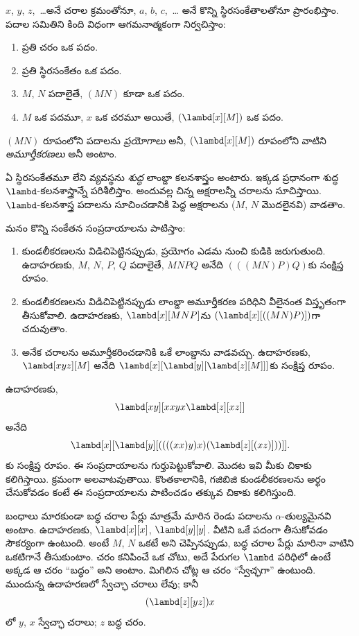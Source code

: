 \documentclass[../../../include/open-logic-section]{subfiles}
\begin{document}

$x$, $y$, $z$,~\dots అనే చరాల క్రమంతోనూ, $a$, $b$, $c$,~\dots
అనే కొన్ని స్థిరసంకేతాలతోనూ ప్రారంభిస్తాం. పదాల సమితిని కింది విధంగా
ఆగమనాత్మకంగా నిర్వచిస్తాం:
\begin{enumerate}
\item ప్రతి చరం ఒక పదం.
\item ప్రతి స్థిరసంకేతం ఒక పదం.
\item $M$, $N$ పదాలైతే, $(MN)$ కూడా ఒక పదం.
\item $M$ ఒక పదమూ, $x$ ఒక చరమూ అయితే, $(\lambd[x][M])$ ఒక పదం.
\end{enumerate}
$(MN)$ రూపంలోని పదాలను \emph{ప్రయోగాలు} అనీ,
$(\lambd[x][M])$ రూపంలోని వాటిని \emph{అమూర్తీకరణలు} అనీ అంటాం.

ఏ స్థిరసంకేతమూ లేని వ్యవస్థను \emph{శుద్ధ} లాంబ్డా కలనశాస్త్రం అంటారు.
ఇక్కడ ప్రధానంగా శుద్ధ $\lambd$-కలనశాస్త్రాన్నే పరిశీలిస్తాం.
అందువల్ల చిన్న అక్షరాలన్నీ చరాలను సూచిస్తాయి. $\lambd$-కలనశాస్త్ర పదాలను సూచించడానికి
పెద్ద అక్షరాలను ($M$, $N$ మొదలైనవి) వాడతాం.

మనం కొన్ని సంకేతన సంప్రదాయాలను పాటిస్తాం:

\begin{conv}
\begin{enumerate}
\item కుండలీకరణలను విడిచిపెట్టినప్పుడు, ప్రయోగం ఎడమ నుంచి కుడికి
  జరుగుతుంది. ఉదాహరణకు, $M$, $N$, $P$, $Q$ పదాలైతే,
  $MNPQ$ అనేది $(((MN)P)Q)$కు సంక్షిప్త రూపం.
\item కుండలీకరణలను విడిచిపెట్టినప్పుడు లాంబ్డా అమూర్తీకరణ పరిధిని
వీలైనంత విస్తృతంగా తీసుకోవాలి. ఉదాహరణకు,
  $\lambd[x][MNP]$ను $(\lambd[x][((MN)P)])$గా చదువుతాం.
\item అనేక చరాలను అమూర్తీకరించడానికి ఒకే లాంబ్డాను వాడవచ్చు.
  ఉదాహరణకు, $\lambd[xyz][M]$ అనేది
  $\lambd[x][\lambd[y][\lambd[z][M]]]$కు సంక్షిప్త రూపం.
\end{enumerate}
\end{conv}

ఉదాహరణకు,
\[
\lambd[xy][xxyx \lambd[z][xz]]
\]
అనేది
\[
\lambd[x][\lambd[y][((((xx)y)x)(\lambd[z][(xz)]))]].
\]
కు సంక్షిప్త రూపం. ఈ సంప్రదాయాలను గుర్తుపెట్టుకోవాలి. మొదట ఇవి మీకు
చికాకు కలిగిస్తాయి. క్రమంగా అలవాటవుతాయి. కొంతకాలానికి, గజిబిజి
కుండలీకరణలను అర్థం చేసుకోవడం కంటే ఈ సంప్రదాయాలను పాటించడం తక్కువ చికాకు కలిగిస్తుంది.

బంధాలు మారకుండా బద్ధ చరాల పేర్లు మాత్రమే మారిన రెండు పదాలను $\alpha$-తుల్యమైనవి
అంటాం. ఉదాహరణకు, $\lambd[x][x]$, $\lambd[y][y]$. వీటిని ఒకే
పదంగా తీసుకోవడం సౌకర్యంగా ఉంటుంది. అంటే $M$, $N$ ఒకటే అని చెప్పినప్పుడు,
బద్ధ చరాల పేర్లు మారినా వాటిని ఒకటిగానే తీసుకుంటాం. చరం కనిపించే ఒక చోటు, అదే పేరుగల
$\lambd$ పరిధిలో ఉంటే అక్కడ ఆ చరం ``బద్ధం'' అని అంటాం. మిగిలిన చోట్ల ఆ చరం
``స్వేచ్ఛగా'' ఉంటుంది. ముందున్న ఉదాహరణలో స్వేచ్ఛా చరాలు లేవు;
కానీ
\[
(\lambd[z][yz])x
\]
లో $y$, $x$ స్వేచ్ఛా చరాలు; $z$ బద్ధ చరం.
\end{document}
